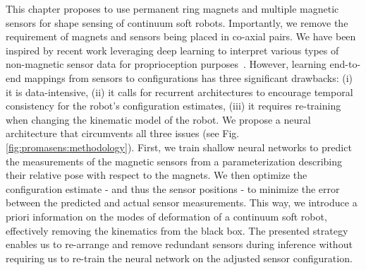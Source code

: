 This chapter proposes to use permanent ring magnets and multiple magnetic sensors for shape sensing of continuum soft robots. Importantly, we remove the requirement of magnets and sensors being placed in co-axial pairs.
%
We have been inspired by recent work leveraging deep learning to interpret various types of non-magnetic sensor data for proprioception purposes~\cite{truby2020distributed, ding2021predictive, soter2018bodily, thuruthel2019soft}.
%
However, learning end-to-end mappings from sensors to configurations has three significant drawbacks: (i) it is data-intensive, (ii) it calls for recurrent architectures to encourage temporal consistency for the robot's configuration estimates, (iii) it requires re-training when changing the kinematic model of the robot. We propose a neural architecture that circumvents all three issues (see Fig. \ref{fig:promasens:methodology}).
First, we train shallow neural networks to predict the measurements of the magnetic sensors from a parameterization describing their relative pose with respect to the magnets. We then optimize the configuration estimate - and thus the sensor positions - to minimize the error between the predicted and actual sensor measurements. 
This way, we introduce a priori information on the modes of deformation of a continuum soft robot, effectively removing the kinematics from the black box. 
The presented strategy enables us to re-arrange and remove redundant sensors during inference without requiring us to re-train the neural network on the adjusted sensor configuration.

